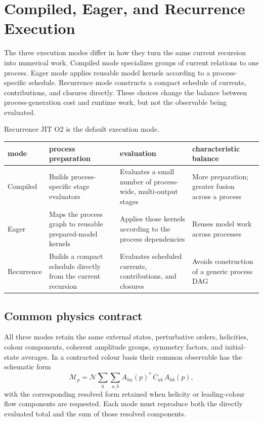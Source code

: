 \section{Compiled, Eager, and Recurrence Execution}
\label{sec:eager-execution}

The three execution modes differ in how they turn the same current recursion
into numerical work. Compiled mode specializes groups of current relations to
one process. Eager mode applies reusable model kernels according to a
process-specific schedule. Recurrence mode constructs a compact schedule of
currents, contributions, and closures directly. These choices change the
balance between process-generation cost and runtime work, but not the
observable being evaluated.

Recurrence JIT O2 is the default execution mode.

\begin{center}
\small
\begin{tabular}{@{}L{0.72in}L{1.85in}L{2.00in}L{1.40in}@{}}
\toprule
\textbf{mode} & \textbf{process preparation} & \textbf{evaluation} &
  \textbf{characteristic balance} \\
\midrule
Compiled
  & Builds process-specific stage evaluators
  & Evaluates a small number of process-wide, multi-output stages
  & More preparation; greater fusion across a process \\
Eager
  & Maps the process graph to reusable prepared-model kernels
  & Applies those kernels according to the process dependencies
  & Reuses model work across processes \\
Recurrence
  & Builds a compact schedule directly from the current recursion
  & Evaluates scheduled currents, contributions, and closures
  & Avoids construction of a generic process DAG \\
\bottomrule
\end{tabular}
\end{center}

\subsection{Common physics contract}

All three modes retain the same external states, perturbative orders,
helicities, colour components, coherent amplitude groups, symmetry factors,
and initial-state averages. In a contracted colour basis their common
observable has the schematic form
\begin{equation}
  \mathcal M_p
  =\mathcal N\sum_h\sum_{a,b}
    A_{ha}(p)^{*}\,C_{ab}\,A_{hb}(p),
  \label{eq:three-mode-common-observable}
\end{equation}
with the corresponding resolved form retained when helicity or leading-colour
flow components are requested. Each mode must reproduce both the directly
evaluated total and the sum of those resolved components.

